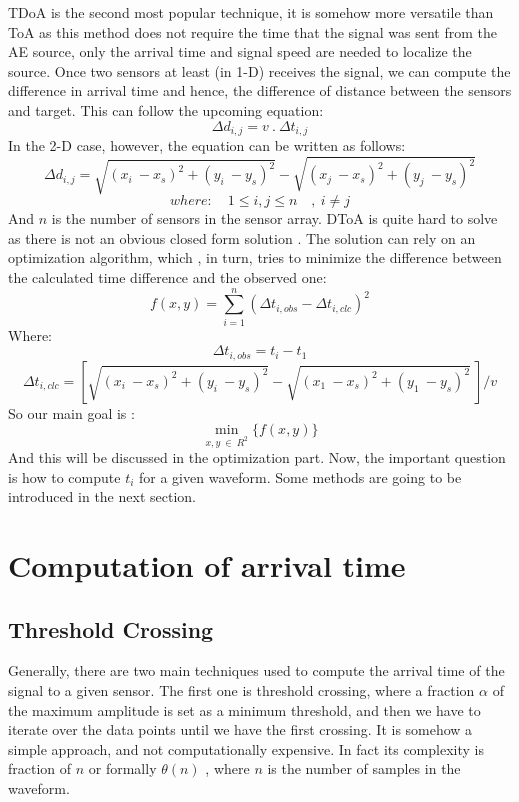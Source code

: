 TDoA is the second most popular technique, it is somehow more versatile
than ToA as this method does not require the time that the signal was
sent from the AE source, only the arrival time and signal speed are
needed to localize the source. Once two sensors at least (in 1-D)
receives the signal, we can compute the difference in arrival time and
hence, the difference of distance between the sensors and target. This
can follow the upcoming equation:\\
{\[\Delta d_{i,j} = v\ .\ \Delta t_{i,j}\]}In the 2-D case, however, the
equation can be written as follows:\\
{\[\Delta d_{i,j} = \sqrt{(x_{i}\  - x_{s})^{2} + (y_{i}\  - y_{s})^{2}} - \sqrt{(x_{j}\  - x_{s})^{2} + (y_{j}\  - y_{s})^{2}}\]}{\[where:\quad 1 \leq i,j \leq n\quad,\ i \neq j\]}And
{\(n\)} is the number of sensors in the sensor array. DToA is quite hard
to solve as there is not an obvious closed form solution . The solution
can rely on an optimization algorithm, which , in turn, tries to
minimize the difference between the calculated time difference and the
observed one:\\
{\[f(x,y) = \sum\limits_{i = 1}^{n}(\Delta t_{i,obs} - \Delta t_{i,clc})^{2}\]}Where:\\
{\[\Delta t_{i,obs} = t_{i} - t_{1}\]}{\[\Delta t_{i,clc} = \left\lbrack \sqrt{(x_{i}\  - x_{s})^{2} + (y_{i}\  - y_{s})^{2}} - \sqrt{(x_{1}\  - x_{s})^{2} + (y_{1}\  - y_{s})^{2}}\  \right\rbrack/v\]}So
our main goal is :\\
{\[\min\limits_{x,y\  \in \ R^{2}}\{ f(x,y)\}\]} And this will be
discussed in the optimization part. Now, the important question is how
to compute {\(t_{i}\)} for a given waveform. Some methods are going to
be introduced in the next section.


\section{Computation of arrival time}


\subsection{Threshold Crossing}

Generally, there are two main techniques used to compute the arrival
time of the signal to a given sensor. The first one is threshold
crossing, where a fraction {\(\alpha\)} of the maximum amplitude is set
as a minimum threshold, and then we have to iterate over the data points
until we have the first crossing. It is somehow a simple approach, and
not computationally expensive. In fact its complexity is fraction of
{\(n\)} or formally {\(\theta(n)\)} , where {\(n\)} is the number of
samples in the waveform.

